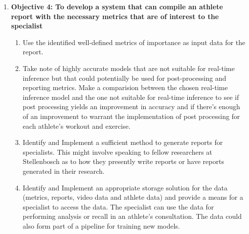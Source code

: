 \begin{enumerate}
    \item \textbf{Objective 4: To develop a system that can compile an athlete report with the necessary metrics that are of interest to the specialist}
        \begin{enumerate}
            \item Use the identified well-defined metrics of importance as input data for the report.
            \item Take note of highly accurate models that are not suitable for real-time inference but that could potentially be used for post-processing and reporting metrics. Make a comparision between the chosen real-time inference model and the one not suitable for real-time inference to see if post processing yields an improvement in accuracy and if there's enough of an improvement to warrant the implementation of post processing for each athlete's workout and exercise. 
            \item Identify and Implement a sufficient method to generate reports for specialists. This might involve speaking to fellow researchers at Stellenbosch as to how they presently write reports or have reports generated in their research.
            \item Identify and Implement an appropriate storage solution for the data (metrics, reports, video data and athlete data) and provide a means for a specialist to access the data. The specialist can use the data for performing analysis or recall in an athlete's consultation. The data could also form part of a pipeline for training new models.
        \end{enumerate}
\end{enumerate}

\label{sec:summaryofworkandcontributions}
\label{sec:overview}
